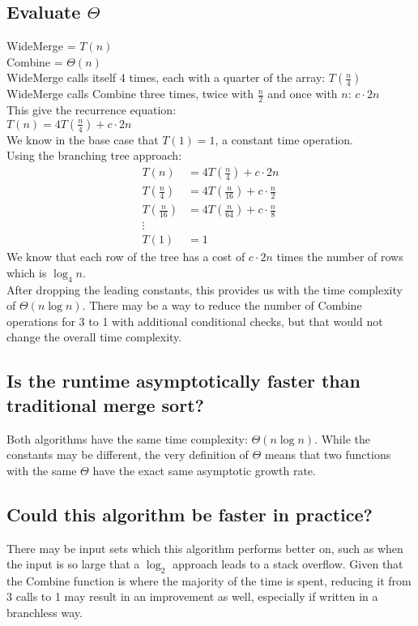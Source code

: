 \documentclass{article}
\begin{document}
    \subsection{Evaluate \(\Theta\)}
        WideMerge = \(T(n)\) \\
        Combine = \(\Theta(n)\) \\
        WideMerge calls itself 4 times, each with a quarter of the array: \(T(\frac{n}{4})\) \\
        WideMerge calls Combine three times, twice with \(\frac{n}{2}\) and once with \(n\): \(c \cdot 2n\) \\
        This give the recurrence equation: \\
        \(T(n) = 4T(\frac{n}{4}) + c \cdot 2n\) \\
        We know in the base case that \(T(1) = 1\), a constant time operation. \\
        Using the branching tree approach: \\
        \begin{align}
            T(n) & = 4T(\frac{n}{4}) + c \cdot 2n \\
            T(\frac{n}{4}) & = 4T(\frac{n}{16}) + c \cdot \frac{n}{2} \\
            T(\frac{n}{16}) & = 4T(\frac{n}{64}) + c \cdot \frac{n}{8} \\
            \vdots \\
            T(1) & = 1
        \end{align}
        We know that each row of the tree has a cost of \(c \cdot 2n\) times the number of rows which is \(\log_4 n\). \\
        After dropping the leading constants, this provides us with the time complexity of \(\Theta(n \log n)\).
        There may be a way to reduce the number of Combine operations for 3 to 1 with additional conditional checks,
        but that would not change the overall time complexity.
    \subsection{Is the runtime asymptotically faster than traditional merge sort?}
        Both algorithms have the same time complexity: \(\Theta(n \log n)\).
        While the constants may be different, the very definition of \(\Theta\) means that two functions with the same \(\Theta\) have the exact same asymptotic growth rate.
    \subsection{Could this algorithm be faster in practice?}
        There may be input sets which this algorithm performs better on, such as when the input is so large that a \(\log_2\) approach leads to a stack overflow.
        Given that the Combine function is where the majority of the time is spent, reducing it from 3 calls to 1 may result in an improvement as well, especially if written in a branchless way.
\end{document}
